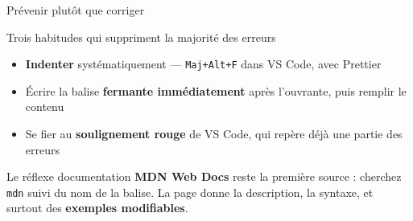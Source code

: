 \documentclass[aspectratio=169,11pt]{beamer}
\begin{document}
\begin{frame}{Prévenir plutôt que corriger}
  \begin{block}{Trois habitudes qui suppriment la majorité des erreurs}
    \begin{itemize}
      \item \textbf{Indenter} systématiquement --- \texttt{Maj+Alt+F} dans VS Code, avec Prettier
      \item Écrire la balise \textbf{fermante immédiatement} après l'ouvrante, puis remplir le contenu
      \item Se fier au \textbf{soulignement rouge} de VS Code, qui repère déjà une partie des erreurs
    \end{itemize}
  \end{block}
  \vspace{0.4cm}
  \begin{exampleblock}{Le réflexe documentation}
    \textbf{MDN Web Docs} reste la première source : cherchez \texttt{mdn} suivi du nom de la balise. La page donne la description, la syntaxe, et surtout des \textbf{exemples modifiables}.
  \end{exampleblock}
\end{frame}
\end{document}
